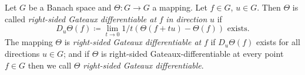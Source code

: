 \begin{definition}\label{def:b2-2.2}
Let $G$ be a Banach space and $\Theta \colon G \to G$ a mapping.
Let $f \in G$, $u \in G$.
Then $\Theta$ is called \emph{right-sided Gateaux differentiable at} $f$ \emph{in direction} $u$ if
\begin{equation}\label{eq:b2-2.3}
D_{u}\Theta(f) \coloneqq \lim_{t \to 0} 1/t(\Theta(f+tu) - \Theta(f)) \text{ exists.}
\end{equation}
The mapping $\Theta$ is \emph{right-sided Gateaux differentiable at} $f$ if\/ $D_{u}\Theta(f)$ exists for all directions $u \in G$; and if\/ $\Theta$ is right-sided Gateaux-differentiable at every point $f \in G$ then we call $\Theta$ \emph{right-sided Gateaux differentiable}.
\end{definition}

